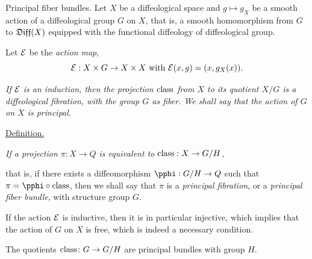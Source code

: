 \begin{Article}{Principal fiber bundles.}{}
  Let $X$ be a diffeological space and $g \mapsto g_X$ be a smooth action of a diffeological group $G$ on $X$,
  that is,
  a smooth homomorphism from $G$ to $\mathfrak{Diff}(X)$ equipped with the functional diffeology of diffeological group.

  Let $\mathcal{E}$ be the {\em action map},
  $$%
    \cE : X \times G \to X \times X
    \SpacedText{with}
    \cE(x,g) = (x,g_X(x)).
  $$%

   {\itshape If $\mathcal{E}$ is an induction,
  then the projection $\operatorname{class}$ from $X$ to its quotient $X/G$ is a diffeological fibration,
  with the group $G$ as fiber.
  We shall say that the action of $G$ on $X$ is \emph{principal}.}

  \uline{Definition.} {\itshape If a projection $\pi : X \to Q$ is equivalent to $\operatorname{class} : X \to G/H$,
  \begin{center}
  \end{center}
  that is,
  if there exists a diffeomorphism $\pphi : G/H \to Q$ such that $\pi = \pphi \circ \Class$,
  then we shall say that $\pi$ is a \emph{principal fibration},
  or a \emph{principal fiber bundle},
  with structure group $G$.}

   If the action $\mathcal{E}$ is inductive,
  then it is in particular injective,
  which implies that the action of $G$ on $X$ is free,
  which is indeed a necessary condition.

   The quotients $\operatorname{class} \colon G \to G/H$ are principal bundles with group $H$.


\end{Article}
